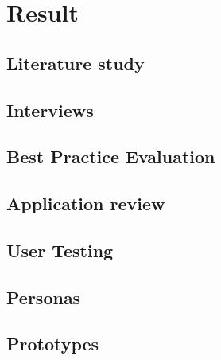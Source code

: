 \chapter{Result}

\section{Literature study}
%
\section{Interviews}
%
\section{Best Practice Evaluation}
%
\section{Application review}
%
\section{User Testing}
%
\section{Personas}
%
\section{Prototypes}
%
